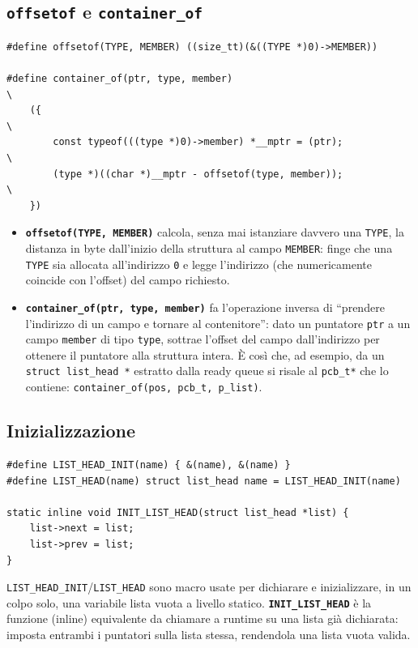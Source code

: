 \documentclass[11pt,a4paper]{article}
\newcommand{\code}[1]{\texttt{#1}}
\newcommand{\func}[1]{\textbf{\texttt{#1}}}
\begin{document}
\subsection{\func{offsetof} e \func{container\_of}}
\begin{lstlisting}
#define offsetof(TYPE, MEMBER) ((size_tt)(&((TYPE *)0)->MEMBER))

#define container_of(ptr, type, member)                                    \
    ({                                                                     \
        const typeof(((type *)0)->member) *__mptr = (ptr);                 \
        (type *)((char *)__mptr - offsetof(type, member));                 \
    })
\end{lstlisting}
\begin{itemize}
\item \func{offsetof(TYPE, MEMBER)} calcola, senza mai istanziare
  davvero una \code{TYPE}, la distanza in byte dall'inizio della struttura al
  campo \code{MEMBER}: finge che una \code{TYPE} sia allocata all'indirizzo
  \code{0} e legge l'indirizzo (che numericamente coincide con l'offset) del
  campo richiesto.
\item \func{container\_of(ptr, type, member)} fa l'operazione inversa
  di ``prendere l'indirizzo di un campo e tornare al contenitore'': dato un
  puntatore \code{ptr} a un campo \code{member} di tipo \code{type}, sottrae
  l'offset del campo dall'indirizzo per ottenere il puntatore alla struttura
  intera. È così che, ad esempio, da un \code{struct list\_head *} estratto
  dalla ready queue si risale al \code{pcb\_t*} che lo contiene:
  \code{container\_of(pos, pcb\_t, p\_list)}.
\end{itemize}

\subsection{Inizializzazione}
\begin{lstlisting}
#define LIST_HEAD_INIT(name) { &(name), &(name) }
#define LIST_HEAD(name) struct list_head name = LIST_HEAD_INIT(name)

static inline void INIT_LIST_HEAD(struct list_head *list) {
    list->next = list;
    list->prev = list;
}
\end{lstlisting}
\code{LIST\_HEAD\_INIT}/\code{LIST\_HEAD} sono macro usate per dichiarare e
inizializzare, in un colpo solo, una variabile lista vuota a livello
statico. \func{INIT\_LIST\_HEAD} è la funzione (inline) equivalente da
chiamare a runtime su una lista già dichiarata: imposta entrambi i puntatori
sulla lista stessa, rendendola una lista vuota valida.
\end{document}
